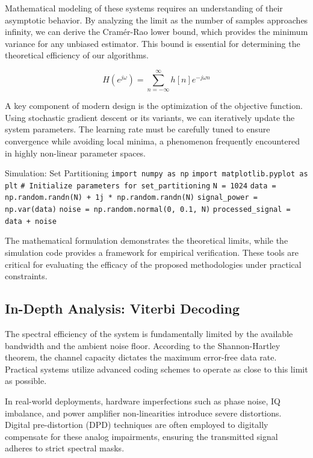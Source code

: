 Mathematical modeling of these systems requires an understanding of their asymptotic behavior. By analyzing the limit as the number of samples approaches infinity, we can derive the Cramér-Rao lower bound, which provides the minimum variance for any unbiased estimator. This bound is essential for determining the theoretical efficiency of our algorithms.

\begin{equation}
    H(e^{j\omega}) = \sum_{n=-\infty}^{\infty} h[n] e^{-j\omega n}
\end{equation}

A key component of modern design is the optimization of the objective function. Using stochastic gradient descent or its variants, we can iteratively update the system parameters. The learning rate must be carefully tuned to ensure convergence while avoiding local minima, a phenomenon frequently encountered in highly non-linear parameter spaces.

\begin{pythonbox}{Simulation: Set Partitioning}
\texttt{import numpy as np}
\texttt{import matplotlib.pyplot as plt}
\texttt{}
\texttt{\# Initialize parameters for set\_partitioning}
\texttt{N = 1024}
\texttt{data = np.random.randn(N) + 1j * np.random.randn(N)}
\texttt{signal\_power = np.var(data)}
\texttt{noise = np.random.normal(0, 0.1, N)}
\texttt{processed\_signal = data + noise}
\end{pythonbox}

\vspace{0.5cm}
The mathematical formulation demonstrates the theoretical limits, while the simulation code provides a framework for empirical verification. These tools are critical for evaluating the efficacy of the proposed methodologies under practical constraints.


\subsection{In-Depth Analysis: Viterbi Decoding}
The spectral efficiency of the system is fundamentally limited by the available bandwidth and the ambient noise floor. According to the Shannon-Hartley theorem, the channel capacity dictates the maximum error-free data rate. Practical systems utilize advanced coding schemes to operate as close to this limit as possible.

In real-world deployments, hardware imperfections such as phase noise, IQ imbalance, and power amplifier non-linearities introduce severe distortions. Digital pre-distortion (DPD) techniques are often employed to digitally compensate for these analog impairments, ensuring the transmitted signal adheres to strict spectral masks.

